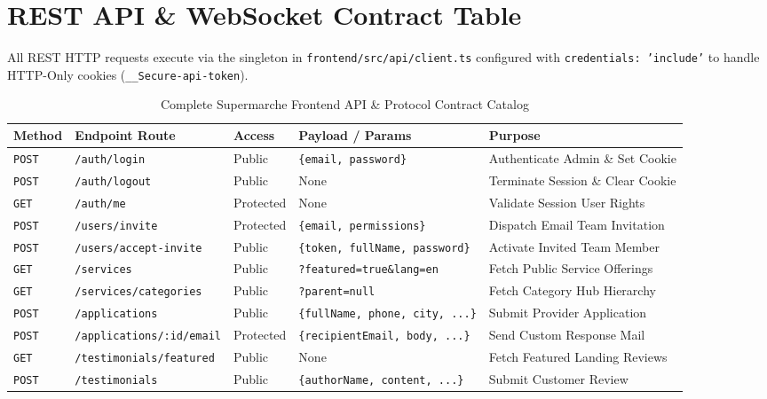 \documentclass[11pt,a4paper]{article}
\begin{document}
\section{REST API \& WebSocket Contract Table}

All REST HTTP requests execute via the singleton in \texttt{frontend/src/api/client.ts} configured with \texttt{credentials: 'include'} to handle HTTP-Only cookies (\texttt{\_\_Secure-api-token}).

\begin{table}[h!]
\centering
\scriptsize
\caption{Complete Supermarche Frontend API \& Protocol Contract Catalog}
\begin{tabular}{lp{3.2cm}lp{3.5cm}l}
\toprule
\textbf{Method} & \textbf{Endpoint Route} & \textbf{Access} & \textbf{Payload / Params} & \textbf{Purpose} \\
\midrule
\texttt{POST} & \texttt{/auth/login} & Public & \texttt{\{email, password\}} & Authenticate Admin \& Set Cookie \\
\texttt{POST} & \texttt{/auth/logout} & Public & None & Terminate Session \& Clear Cookie \\
\texttt{GET}  & \texttt{/auth/me} & Protected & None & Validate Session User Rights \\
\texttt{POST} & \texttt{/users/invite} & Protected & \texttt{\{email, permissions\}} & Dispatch Email Team Invitation \\
\texttt{POST} & \texttt{/users/accept-invite} & Public & \texttt{\{token, fullName, password\}} & Activate Invited Team Member \\
\texttt{GET}  & \texttt{/services} & Public & \texttt{?featured=true\&lang=en} & Fetch Public Service Offerings \\
\texttt{GET}  & \texttt{/services/categories} & Public & \texttt{?parent=null} & Fetch Category Hub Hierarchy \\
\texttt{POST} & \texttt{/applications} & Public & \texttt{\{fullName, phone, city, ...\}} & Submit Provider Application \\
\texttt{POST} & \texttt{/applications/:id/email}& Protected & \texttt{\{recipientEmail, body, ...\}} & Send Custom Response Mail \\
\texttt{GET}  & \texttt{/testimonials/featured} & Public & None & Fetch Featured Landing Reviews \\
\texttt{POST} & \texttt{/testimonials} & Public & \texttt{\{authorName, content, ...\}} & Submit Customer Review \\

\end{tabular}
\end{table}
\end{document}
